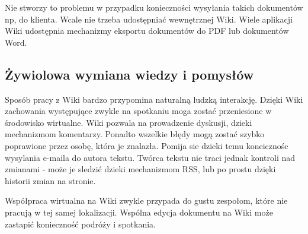 \documentclass{article}
\begin{document}
		Nie stworzy to problemu w przypadku konieczności wysyłania takich dokumentów np, do klienta. Wcale nie trzeba udostępniać wewnętrznej Wiki. Wiele aplikacji Wiki udostępnia mechanizmy eksportu dokumentów do PDF lub dokumentów Word.

	\subsection{Żywiolowa wymiana wiedzy i pomysłów}




		Sposób pracy z Wiki bardzo przypomina naturalną ludzką interakcję. Dzięki Wiki zachowania występujące zwykle na spotkaniu moga zostać przeniesione w środowisko wirtualne. Wiki pozwala na prowadzenie dyskusji, dzieki mechanizmom komentarzy. Ponadto wszelkie błędy mogą zostać szybko poprawione przez osobę, która je znalazła. Pomija sie dzieki temu koneicznośc wysylania e-maila do autora tekstu. Twórca tekstu nie traci jednak kontroli nad zmianami - może je sledzić dzieki mechanizmom RSS, lub po prostu dzięki historii zmian na stronie.

		Współpraca wirtualna na Wiki zwykle przypada do gustu zespołom, które nie pracują w tej samej lokalizacji. Wspólna edycja dokumentu na Wiki może zastapić konieczność podróży i spotkania. 


\end{document}
